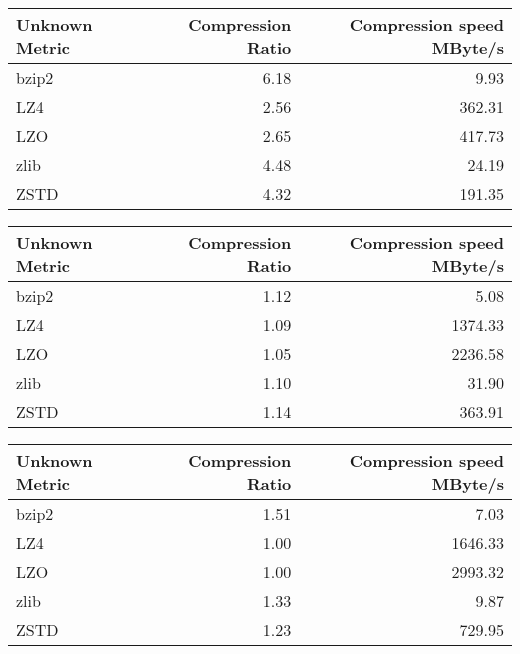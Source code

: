 
\begin{tabular}{lrr}
\hline
 Unknown Metric   &   Compression Ratio &   Compression speed MByte/s \\
\hline
 bzip2            &                6.18 &                        9.93 \\
 LZ4              &                2.56 &                      362.31 \\
 LZO              &                2.65 &                      417.73 \\
 zlib             &                4.48 &                       24.19 \\
 ZSTD             &                4.32 &                      191.35 \\
\hline
\end{tabular}
\begin{tabular}{lrr}
\hline
 Unknown Metric   &   Compression Ratio &   Compression speed MByte/s \\
\hline
 bzip2            &                1.12 &                        5.08 \\
 LZ4              &                1.09 &                     1374.33 \\
 LZO              &                1.05 &                     2236.58 \\
 zlib             &                1.10 &                       31.90 \\
 ZSTD             &                1.14 &                      363.91 \\
\hline
\end{tabular}
\begin{tabular}{lrr}
\hline
 Unknown Metric   &   Compression Ratio &   Compression speed MByte/s \\
\hline
 bzip2            &                1.51 &                        7.03 \\
 LZ4              &                1.00 &                     1646.33 \\
 LZO              &                1.00 &                     2993.32 \\
 zlib             &                1.33 &                        9.87 \\
 ZSTD             &                1.23 &                      729.95 \\
\hline
\end{tabular}
